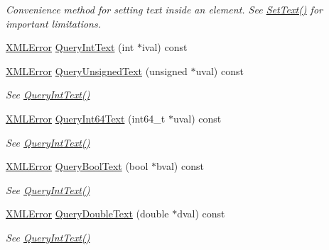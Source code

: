 \begin{DoxyCompactItemize}
\begin{DoxyCompactList}\small\item\em Convenience method for setting text inside an element. See \hyperlink{classtinyxml2_1_1_x_m_l_element_a1f9c2cd61b72af5ae708d37b7ad283ce}{Set\+Text()} for important limitations. \end{DoxyCompactList}\item 
\hyperlink{namespacetinyxml2_a1fbf88509c3ac88c09117b1947414e08}{X\+M\+L\+Error} \hyperlink{classtinyxml2_1_1_x_m_l_element_a926357996bef633cb736e1a558419632}{Query\+Int\+Text} (int $\ast$ival) const
\item 
\hyperlink{namespacetinyxml2_a1fbf88509c3ac88c09117b1947414e08}{X\+M\+L\+Error} \hyperlink{classtinyxml2_1_1_x_m_l_element_a14d38aa4b5e18a46274a27425188a6a1}{Query\+Unsigned\+Text} (unsigned $\ast$uval) const
\begin{DoxyCompactList}\small\item\em See \hyperlink{classtinyxml2_1_1_x_m_l_element_a926357996bef633cb736e1a558419632}{Query\+Int\+Text()} \end{DoxyCompactList}\item 
\hyperlink{namespacetinyxml2_a1fbf88509c3ac88c09117b1947414e08}{X\+M\+L\+Error} \hyperlink{classtinyxml2_1_1_x_m_l_element_a120c538c8eead169e635dbc70fb226d8}{Query\+Int64\+Text} (int64\+\_\+t $\ast$uval) const
\begin{DoxyCompactList}\small\item\em See \hyperlink{classtinyxml2_1_1_x_m_l_element_a926357996bef633cb736e1a558419632}{Query\+Int\+Text()} \end{DoxyCompactList}\item 
\hyperlink{namespacetinyxml2_a1fbf88509c3ac88c09117b1947414e08}{X\+M\+L\+Error} \hyperlink{classtinyxml2_1_1_x_m_l_element_a3fe5417d59eb8f5c4afe924b7d332736}{Query\+Bool\+Text} (bool $\ast$bval) const
\begin{DoxyCompactList}\small\item\em See \hyperlink{classtinyxml2_1_1_x_m_l_element_a926357996bef633cb736e1a558419632}{Query\+Int\+Text()} \end{DoxyCompactList}\item 
\hyperlink{namespacetinyxml2_a1fbf88509c3ac88c09117b1947414e08}{X\+M\+L\+Error} \hyperlink{classtinyxml2_1_1_x_m_l_element_a684679c99bb036a25652744cec6c4d96}{Query\+Double\+Text} (double $\ast$dval) const
\begin{DoxyCompactList}\small\item\em See \hyperlink{classtinyxml2_1_1_x_m_l_element_a926357996bef633cb736e1a558419632}{Query\+Int\+Text()} \end{DoxyCompactList}\item 

\end{DoxyCompactItemize}
